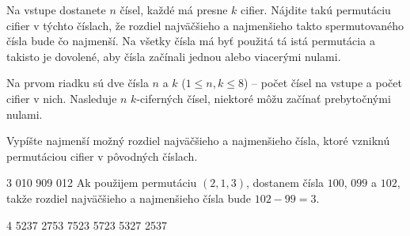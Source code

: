 





Na vstupe dostanete $n$ čísel, každé má presne $k$ cifier. Nájdite takú permutáciu cifier v týchto
číslach, že rozdiel najväčšieho a najmenšieho takto spermutovaného čísla bude čo najmenší. Na všetky čísla
má byť použitá tá istá permutácia a takisto je dovolené, aby čísla začínali jednou alebo viacerými nulami.


Na prvom riadku sú dve čísla $n$ a $k$ ($1 \leq n, k \leq 8$) -- počet čísel na vstupe a počet
cifier v nich. Nasleduje $n$ $k$-ciferných čísel, niektoré môžu začínať prebytočnými nulami.


Vypíšte najmenší možný rozdiel najväčšieho a najmenšieho čísla, ktoré vzniknú permutáciou cifier v
pôvodných číslach.


 3
010
909
012
\komentar
Ak použijem permutáciu $(2, 1, 3)$, dostanem čísla $100$, $099$ a $102$, takže rozdiel najväčšieho a
najmenšieho čísla bude $102 - 99 = 3$.
\koniec

 4
5237
2753
7523
5723
5327
2537
\koniec


